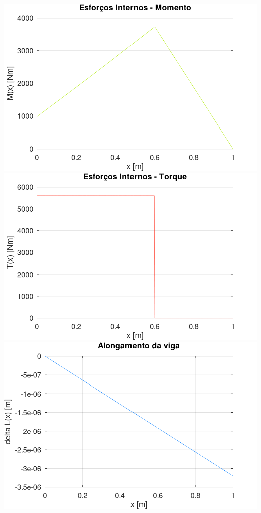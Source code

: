 \documentclass[10pt]{article}
\begin{document}
\begin{center}
    \includegraphics[scale=0.25]{figure3.png}
    \includegraphics[scale=0.25]{figure4.png}
    \includegraphics[scale=0.25]{figure5.png}

\end{center}
\end{document}
